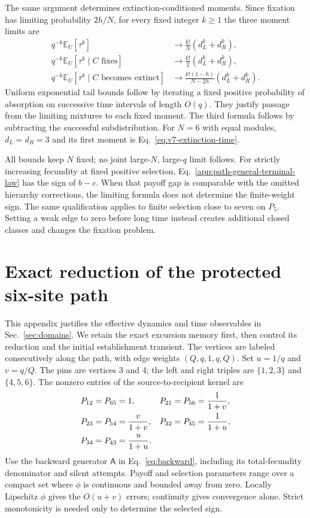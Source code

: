 \documentclass[aps,pre,reprint,amsmath,amssymb,longbibliography]{revtex4-2}
\makeatletter
\newcommand{\E}{\mathbb E}
\newcommand{\labelalias}[2]{\@ifundefined{r@#2}{}{%
\protected@write\@auxout{}{\string\newlabel{#1}{\csname r@#2\endcsname}}}}
\makeatother
\begin{document}
The same argument determines extinction-conditioned moments.
Since fixation has limiting probability $2h/N$, for every fixed
integer $k\ge1$ the three moment limits are
\begin{equation}
 \begin{aligned}
 q^{-k}\E_U[\tau^k]&\longrightarrow
            \frac{k!}{N}(d_L^k+d_R^k),\\
 q^{-k}\E_U[\tau^k\mid C\text{ fixes}]&\longrightarrow
            \frac{k!}{2}(d_L^k+d_R^k),\\
 q^{-k}\E_U[\tau^k\mid C\text{ becomes extinct}]&\longrightarrow
       \frac{k!(1-h)}{N-2h}(d_L^k+d_R^k).
 \end{aligned}
 \label{eq:v7-path-all-moments}
\end{equation}
Uniform exponential tail bounds follow by iterating a fixed positive
probability of absorption on successive time intervals of length
$O(q)$. They justify passage from the limiting mixtures to each
fixed moment. The third formula follows by subtracting the
successful subdistribution. For $N=6$ with equal modules,
$d_L=d_R=3$ and its first moment is
Eq.~\eqref{eq:v7-extinction-time}.


All bounds keep $N$ fixed; no joint large-$N$, large-$q$ limit follows.
For strictly increasing fecundity at fixed positive selection,
Eq.~\eqref{app:path-general-terminal-law} has the sign of $b-c$.
When that payoff gap is comparable with the omitted hierarchy corrections,
the limiting formula does not determine the finite-weight sign. The same
qualification applies to finite selection close to seven on $P_5$.
Setting a weak edge to zero before long time instead creates additional
closed classes and changes the fixation problem.

\section{Exact reduction of the protected six-site path}
\label{app:p6-protected}
This appendix justifies the effective dynamics and time observables
in Sec.~\ref{sec:domains}. We retain the exact excursion memory first,
then control its reduction and the initial establishment transient.
The vertices are labeled consecutively along the path, with edge weights
$(Q,q,1,q,Q)$. Set $u=1/q$ and $v=q/Q$. The pins are vertices 3 and 4;
the left and right triples are $\{1,2,3\}$ and $\{4,5,6\}$. The
nonzero entries of the source-to-recipient kernel are
\begin{align}
 P_{12}=P_{65}&=1,&
 P_{21}=P_{56}&=\frac1{1+v},\notag\\
 P_{23}=P_{54}&=\frac v{1+v},&
 P_{32}=P_{45}&=\frac1{1+u},\notag\\
 P_{34}=P_{43}&=\frac u{1+u}.
 \label{eq:app-p6-kernel}
\end{align}
Use the backward generator $\mathsf A$ in Eq.~\eqref{eq:backward},
including its total-fecundity denominator and silent attempts.
Payoff and selection parameters range over a compact set where
$\phi$ is continuous and bounded away from zero. Locally Lipschitz
$\phi$ gives the $O(u+v)$ errors; continuity gives convergence alone.
Strict monotonicity is needed only to determine the selected sign.
\labelalias{eq:app-p6-full-generator}{eq:backward}
\end{document}
